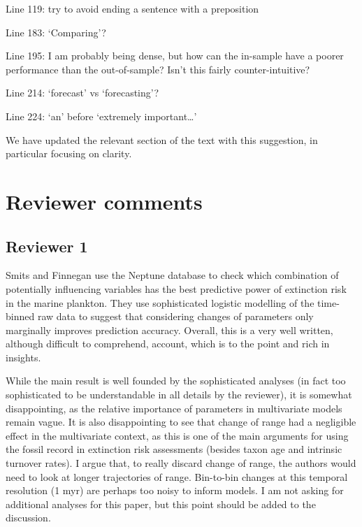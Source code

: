 \documentclass[12pt,letterpaper]{article}
\begin{document}
\begin{refsection}
\begin{bfseries}
  Line 119: try to avoid ending a sentence with a preposition 

  Line 183: ‘Comparing’? 

  Line 195: I am probably being dense, but how can the in-sample have a poorer performance than the out-of-sample? Isn’t this fairly counter-intuitive?

  Line 214: ‘forecast’ vs ‘forecasting’?

  Line 224: ‘an’ before ‘extremely important…’
\end{bfseries}

We have updated the relevant section of the text with this suggestion, in particular focusing on clarity.




\section{Reviewer comments}

\subsection{Reviewer 1}

\begin{bfseries}
  Smits and Finnegan use the Neptune database to check which combination of potentially influencing variables has the best predictive power of extinction risk in the marine plankton. They use sophisticated logistic modelling of the time-binned raw data to suggest that considering changes of parameters only marginally improves prediction accuracy. Overall, this is a very well written, although difficult to comprehend, account, which is to the point and rich in insights.

  While the main result is well founded by the sophisticated analyses (in fact too sophisticated to be understandable in all details by the reviewer), it is somewhat disappointing, as the relative importance of parameters in multivariate models remain vague. It is also disappointing to see that change of range had a negligible effect in the multivariate context, as this is one of the main arguments for using the fossil record in extinction risk assessments (besides taxon age and intrinsic turnover rates). I argue that, to really discard change of range, the authors would need to look at longer trajectories of range. Bin-to-bin changes at this temporal resolution (1 myr) are perhaps too noisy to inform models. I am not asking for additional analyses for this paper, but this point should be added to the discussion.
\end{bfseries}


\end{refsection}
\end{document}

